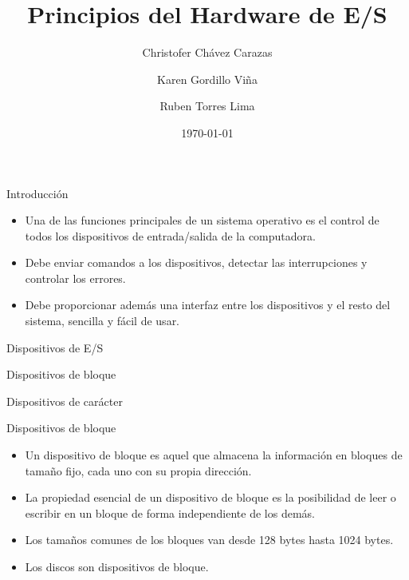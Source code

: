 \documentclass{beamer}
\title{Principios del Hardware de E/S}
\author{Christofer Chávez Carazas
        \and Karen Gordillo Viña
        \and Ruben Torres Lima}
\institute[Universities of Somewhere and Elsewhere] 
{Universidad Nacional de San Agustín \\ Ciencia de la Computación}
\date{\today}
\begin{document}
\begin{frame}
  \titlepage
\end{frame}




\begin{frame}{Introducción}
\begin{itemize}
    

 \item  Una de las funciones principales de un sistema operativo es el control de todos los dispositivos de entrada/salida de la computadora.
  
  \item Debe enviar comandos a los dispositivos, detectar las interrupciones y controlar los errores.
  \item Debe proporcionar además una interfaz entre los dispositivos y el resto del sistema, sencilla y fácil de usar.
\end{itemize}
\end{frame}

\begin{frame}{Dispositivos de E/S}
    \begin{block}{}
    Dispositivos de bloque
    \end{block}
    \begin{block}{}
    Dispositivos de carácter
    \end{block}
\end{frame}

\begin{frame}{Dispositivos de bloque}
    \begin{itemize}
    
    \item Un dispositivo de bloque es aquel que almacena la información en bloques de tamaño fijo, cada uno con su propia dirección.
    
    
    \item La propiedad esencial de un dispositivo de bloque es la posibilidad de leer o escribir en un bloque de forma independiente de los demás.
    
    
    \item Los tamaños comunes de los bloques van desde 128 bytes hasta 1024 bytes.
    
    
    \item Los discos son dispositivos de bloque.
    
    \end{itemize}
    
\end{frame}
\end{document}
